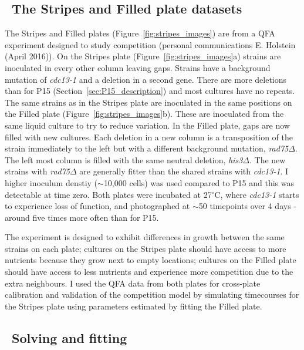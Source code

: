 \subsection{\thesubsection~The Stripes and Filled plate datasets}
\label{sec:stripes_description}

The Stripes and Filled plates (Figure~\ref{fig:stripes_images}) are
from a QFA experiment designed to study competition (personal
communications E. Holstein (April 2016)). On the Stripes plate
(Figure~\ref{fig:stripes_images}a) strains are inoculated in every
other column leaving gaps. Strains have a background mutation of
\textit{cdc13-1} and a deletion in a second gene. There are more
deletions than for P15 (Section~\ref{sec:P15_description}) and most
cultures have no repeats. The same strains as in the Stripes plate are
inoculated in the same positions on the Filled plate
(Figure~\ref{fig:stripes_images}b). These are inoculated from the same
liquid culture to try to reduce variation. In the Filled plate, gaps
are now filled with new cultures. Each deletion in a new column is a
transposition of the strain immediately to the left but with a
different background mutation, \textit{rad75}\(\Delta\). The left most
column is filled with the same neutral deletion,
\textit{his3}\(\Delta\). The new strains with \textit{rad75}\(\Delta\)
are generally fitter than the shared strains with \textit{cdc13-1}. I
higher inoculum denstiy (\(\sim\)10,000 cells) was used compared to
P15 and this was detectable at time zero. Both plates were incubated
at 27\(^{\circ}\)C, where \textit{cdc13-1} starts to experience loss
of function, and photographed at \(\sim\)50 timepoints over 4 days -
around five times more often than for P15.

The experiment is designed to exhibit differences in growth between
the same strains on each plate; cultures on the Stripes plate should
have access to more nutrients because they grow next to empty
locations; cultures on the Filled plate should have access to less
nutrients and experience more competition due to the extra
neighbours. I used the QFA data from both plates for cross-plate
calibration and validation of the competition model by simulating
timecourses for the Stripes plate using parameters estimated by
fitting the Filled plate.

\subsection{\thesubsection~Solving and fitting}

